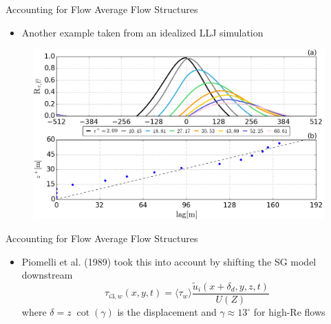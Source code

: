 \begin{frame}{Accounting for Flow Average Flow Structures}
\begin{itemize}
	\item Another example taken from an idealized LLJ simulation
\end{itemize}
\begin{figure}
	\includegraphics[width=1\textwidth]{sbc5}
\end{figure}
\end{frame}
\begin{frame}{Accounting for Flow Average Flow Structures}
\begin{itemize}
	\item Piomelli et al. (1989) took this into account by shifting the SG model downstream
	$$\tau_{i3,w}(x,y,t) = \langle \tau_w \rangle \frac{\tilde{u}_i(x + \delta_d,y,z,t)}{U(Z)}$$
	where $\delta = z\;\cot({\gamma})$ is the displacement and $\gamma \approx 13^\circ$ for high-Re flows
\end{itemize}
\end{frame}
